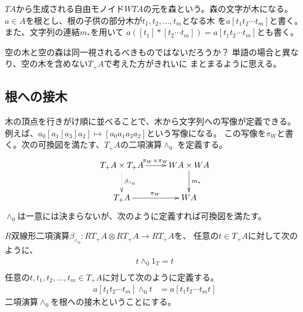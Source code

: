 		$TA$から生成される自由モノイド$WTA$の元を森という。森の文字が木になる。
		$a\in A$を根とし、根の子供の部分木が$t_1,t_2,\dots,t_m$となる木
		を$a[t_1t_2\cdots t_m]$と書く。また、文字列の連結$m_*$を用いて
		$a([t_1]*[t_2\cdots t_m])=a[t_1t_2\cdots t_m]$とも書く。

		\begin{todo}[空の木と空の森]\label{todo:空の木と空の森} %
			空の木と空の森は同一視されるべきものではないだろうか？
			単語の場合と異なり、空の木を含めない$T_+A$で考えた方がきれいに
			まとまるように思える。
		\end{todo} %

	\subsection{根への接木}\label{s2:根への接木} %
		木の頂点を行きがけ順に並べることで、木から文字列への写像が定義できる。
		例えば、$a_0[a_1[a_3]a_2]\mapsto[a_0a_1a_3a_2]$という写像になる。
		この写像を$\pi_W$と書く。次の可換図を満たす、$T_+A$の二項演算$\land_0$
		を定義する。
		\begin{equation}\label{eq:行きがけ順を保つ二項演算}\xymatrix{
			T_+A\times T_+A \ar@{.>}[d]^{\beta_{\land_0}} \ar[r]^{\pi_W\times\pi_W}
			& WA\times WA \ar[d]^{m_*} \\
			T_+A \ar[r]^{\pi_W} & WA \\
		}\end{equation}
		$\land_0$は一意には決まらないが、次のように定義すれば可換図を満たす。

		\begin{definition}[根への接木]\label{def:根への接木} %
			$R$双線形二項演算$\beta_{\land_0}: RT_+A\otimes RT_+A \to RT_+A$を、
			任意の$t\in T_+A$に対して次のように、
			\begin{equation*}\begin{split} %
				t\land_0 1_T = t \\
			\end{split}\end{equation*} %
			任意の$t,t_1,t_2,\dots,t_m\in T_+A$に対して次のように定義する。
			\begin{equation*}\begin{split} %
				a[t_1t_2\cdots t_m]\land_0 t &= a[t_1t_2\cdots t_mt] 
			\end{split}\end{equation*} %
			二項演算$\land_0$を根への接木ということにする。
		\end{definition} %

